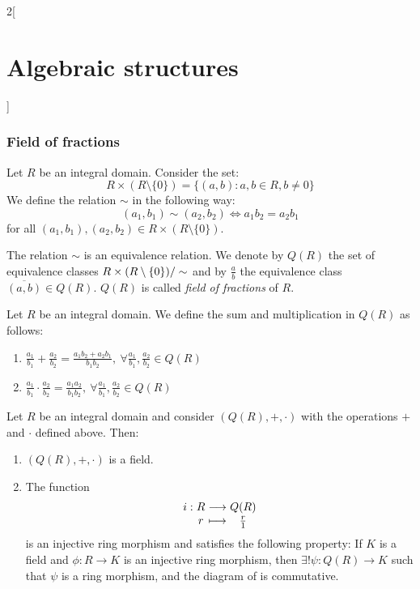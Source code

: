 \documentclass[../../../main_math.tex]{subfiles}
\begin{document}
\begin{multicols}{2}[\section{Algebraic structures}]
  \subsubsection{Field of fractions}
  \begin{definition}\label{AS:field-frac}
    Let $R$ be an integral domain. Consider the set: $$R\times(R\setminus\{0\})=\{(a,b):a,b\in R,b\ne 0\}$$ We define the relation $\sim$ in the following way: $$(a_1,b_1)\sim(a_2,b_2)\iff a_1b_2=a_2b_1$$ for all $(a_1,b_1),(a_2,b_2)\in R\times(R\setminus\{0\})$.
  \end{definition}
  \begin{lemma}
    The relation $\sim$ is an equivalence relation. We denote by $Q(R)$ the set of equivalence classes $\quot{R\times(R\setminus\{0\})}{\sim}$ and by $\frac{a}{b}$ the equivalence class $\overline{(a,b)}\in Q(R)$. $Q(R)$ is called \emph{field of fractions} of $R$.
  \end{lemma}
  \begin{definition}
    Let $R$ be an integral domain. We define the sum and multiplication in $Q(R)$ as follows:
    \begin{enumerate}
      \item $\displaystyle\frac{a_1}{b_1}+\frac{a_2}{b_2}=\frac{a_1b_2+a_2b_1}{b_1b_2},\ \forall\frac{a_1}{b_1},\frac{a_2}{b_2}\in Q(R)$
      \item $\displaystyle\frac{a_1}{b_1}\cdot\frac{a_2}{b_2}=\frac{a_1a_2}{b_1b_2},\ \forall\frac{a_1}{b_1},\frac{a_2}{b_2}\in Q(R)$
    \end{enumerate}
  \end{definition}
  \begin{theorem}
    Let $R$ be an integral domain and consider $(Q(R),+,\cdot)$ with the operations $+$ and $\cdot$ defined above. Then:
    \begin{enumerate}
      \item $(Q(R),+,\cdot)$ is a field.
      \item The function
            $$\function{i}{R}{Q(R)}{r}{\frac{r}{1}}$$
            is an injective ring morphism and satisfies the following property: If $K$ is a field and $\phi:R\rightarrow K$ is an injective ring morphism, then $\exists!\psi:Q(R)\rightarrow K$ such that $\psi$ is a ring morphism, and the diagram of  is commutative.
    \end{enumerate}
    \begin{center}
      \begin{minipage}{\linewidth}
        \centering
        
        \label{AS:theorem4}
      \end{minipage}
    \end{center}
  \end{theorem}

\end{multicols}
\end{document}
